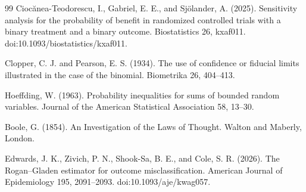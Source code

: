 \documentclass{article}
\begin{document}
\begin{thebibliography}{99}
   Ciocănea-Teodorescu, I., Gabriel, E. E., and Sjölander, A. (2025). Sensitivity analysis for the probability of benefit in randomized controlled trials with a binary treatment and a binary outcome. Biostatistics 26, kxaf011. doi:10.1093/biostatistics/kxaf011.

   Clopper, C. J. and Pearson, E. S. (1934). The use of confidence or fiducial limits illustrated in the case of the binomial. Biometrika 26, 404--413.

   Hoeffding, W. (1963). Probability inequalities for sums of bounded random variables. Journal of the American Statistical Association 58, 13--30.

   Boole, G. (1854). An Investigation of the Laws of Thought. Walton and Maberly, London.

   Edwards, J. K., Zivich, P. N., Shook-Sa, B. E., and Cole, S. R. (2026). The Rogan--Gladen estimator for outcome misclassification. American Journal of Epidemiology 195, 2091--2093. doi:10.1093/aje/kwag057.

\end{thebibliography}
\end{document}
